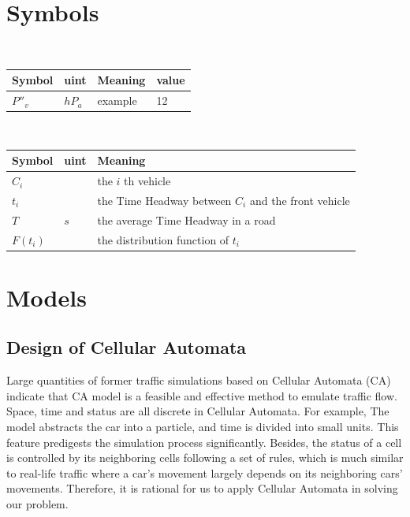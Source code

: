 \documentclass{mcmthesis}
\begin{document}
\section{Symbols}
\begin{table}[H]
        \setlength{\abovecaptionskip}{0pt}
        \setlength{\belowcaptionskip}{0pt}
				\\
        \begin{tabular}{p{2cm}|p{2cm}|p{7.5cm}|p{1.7cm}}
		\hline
		\rowcolor[gray]{0.9}\bf{Symbol}	&\bf{uint}      &\bf{Meaning}&\bf{value}	\\
		\hline
		${P}''_{v}$		& $hP_{a}$		 & example  &12\\

		\hline
	\end{tabular}
\end{table}

\begin{table}[H]
        \setlength{\abovecaptionskip}{0pt}
        \setlength{\belowcaptionskip}{0pt}
         \\
        \begin{tabular}{p{1.8cm}|p{2.2cm}|p{9cm}}
        \hline
        \rowcolor[gray]{0.9}\bf{Symbol}	&\bf{uint}      &\bf{Meaning}\\
        \hline
        $C_{i}$	&$ $ &the $i$ th vehicle\\
        $t_{i}$	&$ $ &the Time Headway between $ C_{i} $ and the front vehicle\\
        $T$	&$s$ &the average Time Headway in a road\\
        $F(t_{i})$	&$ $ &the distribution function of $t_{i}$\\
        \hline 
        \end{tabular}
        \end{table}

\section{Models}
\subsection{Design of Cellular Automata }
Large quantities of former traffic simulations based on Cellular Automata (CA) indicate that CA model is a feasible and effective method to emulate traffic flow. Space, time and status are all discrete in Cellular Automata. For example, The model abstracts the car into a particle, and time is divided into small units. This feature predigests the simulation process significantly. Besides, the status of a cell is controlled by its neighboring cells following a set of rules, which is much similar to real-life traffic where a car's movement largely depends on its neighboring cars' movements. Therefore, it is rational for us to apply Cellular Automata in solving our problem.
\\
\end{document}
